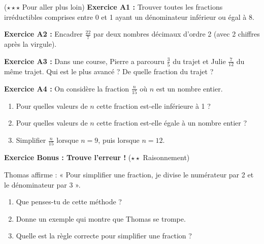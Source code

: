 \begin{exercisebox}[Approfondissement] ($\star\star\star$ Pour aller plus loin)
	\textbf{Exercice A1 :} Trouver toutes les fractions irréductibles comprises entre 0 et 1 ayant un dénominateur inférieur ou égal à 8.
	
	\medskip
	
	\textbf{Exercice A2 :} Encadrer $\frac{22}{7}$ par deux nombres décimaux d'ordre 2 (avec 2 chiffres après la virgule).
	
	\medskip
	
	\textbf{Exercice A3 :} Dans une course, Pierre a parcouru $\frac{3}{5}$ du trajet et Julie $\frac{7}{12}$ du même trajet. Qui est le plus avancé ? De quelle fraction du trajet ?
	
	\medskip
	
	\textbf{Exercice A4 :} On considère la fraction $\frac{n}{15}$ où $n$ est un nombre entier.
	\begin{enumerate}[label=\alph*)]
		\item Pour quelles valeurs de $n$ cette fraction est-elle inférieure à 1 ?
		\item Pour quelles valeurs de $n$ cette fraction est-elle égale à un nombre entier ?
		\item Simplifier $\frac{n}{15}$ lorsque $n = 9$, puis lorsque $n = 12$.
	\end{enumerate}

	\medskip

	\textbf{Exercice Bonus : Trouve l'erreur !} ($\star\star$ Raisonnement)

	Thomas affirme : « Pour simplifier une fraction, je divise le numérateur par 2 et le dénominateur par 3 ».

	\begin{enumerate}[label=\alph*)]
		\item Que penses-tu de cette méthode ?


		\item Donne un exemple qui montre que Thomas se trompe.


		\item Quelle est la règle correcte pour simplifier une fraction ?

	\end{enumerate}
\end{exercisebox}